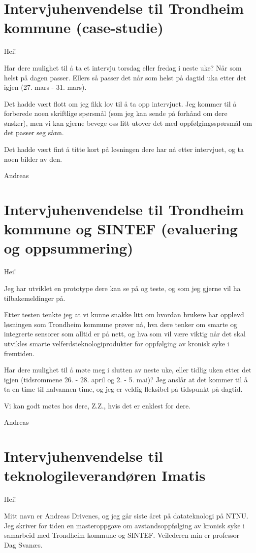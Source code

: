 \section{Intervjuhenvendelse til Trondheim kommune (case-studie)}
Hei!

Har dere mulighet til å ta et intervju torsdag eller fredag i neste uke? Når som helst på dagen passer. 
Ellers så passer det når som helst på dagtid uka etter det igjen (27. mars - 31. mars).

Det hadde vært flott om jeg fikk lov til å ta opp intervjuet. Jeg kommer til å forberede noen skriftlige spørsmål
(som jeg kan sende på forhånd om dere ønsker),
men vi kan gjerne bevege oss litt utover det med oppfølgingsspørsmål om det passer seg sånn. 

Det hadde vært fint å titte kort på løsningen dere har nå etter intervjuet, og ta noen bilder av den.

Andreas

\section{Intervjuhenvendelse til Trondheim kommune og SINTEF (evaluering og oppsummering)}
Hei! 

Jeg har utviklet en prototype dere kan se på og teste, og som jeg gjerne vil ha tilbakemeldinger på.

Etter testen tenkte jeg at vi kunne snakke litt om hvordan brukere har opplevd løsningen som Trondheim kommune prøver nå, hva dere tenker om smarte
og integrerte sensorer som alltid er på nett, og hva som vil være viktig når det skal utvikles smarte velferdsteknologiprodukter for oppfølging av
kronisk syke i fremtiden.

Har dere mulighet til å møte meg i slutten av neste uke, eller tidlig uken etter det igjen (tidsrommene 26. - 28. april og 2. - 5. mai)? Jeg anslår
at det kommer til å ta en time til halvannen time, og jeg er veldig fleksibel på tidspunkt på dagtid. 

Vi kan godt møtes hos dere, Z.Z., hvis det er enklest for dere.

Andreas

\section{Intervjuhenvendelse til teknologileverandøren Imatis}
Hei! 

Mitt navn er Andreas Drivenes, og jeg går siste året på datateknologi på NTNU. Jeg skriver for tiden en masteroppgave
om avstandsoppfølging av kronisk syke i samarbeid med Trondheim kommune og SINTEF. Veilederen min er professor Dag Svanæs.

